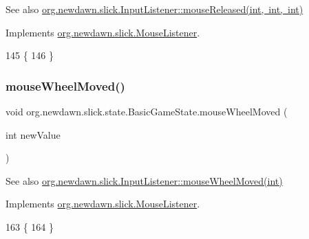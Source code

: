 \begin{DoxySeeAlso}{See also}
\mbox{\hyperlink{interfaceorg_1_1newdawn_1_1slick_1_1_mouse_listener_a8d1606869f610664f9299565067d5571}{org.\+newdawn.\+slick.\+Input\+Listener\+::mouse\+Released(int, int, int)}} 
\end{DoxySeeAlso}


Implements \mbox{\hyperlink{interfaceorg_1_1newdawn_1_1slick_1_1_mouse_listener_a8d1606869f610664f9299565067d5571}{org.\+newdawn.\+slick.\+Mouse\+Listener}}.


\begin{DoxyCode}
145                                                         \{
146     \}
\end{DoxyCode}
\mbox{\label{classorg_1_1newdawn_1_1slick_1_1state_1_1_basic_game_state_ab4d1fd4e3f8f09700b62bb37fd29006a}} 
\subsubsection{\texorpdfstring{mouse\+Wheel\+Moved()}{mouseWheelMoved()}}
{\footnotesize\ttfamily void org.\+newdawn.\+slick.\+state.\+Basic\+Game\+State.\+mouse\+Wheel\+Moved (\begin{DoxyParamCaption}\item[{int}]{new\+Value }\end{DoxyParamCaption})\hspace{0.3cm}{\ttfamily [inline]}}

\begin{DoxySeeAlso}{See also}
\mbox{\hyperlink{interfaceorg_1_1newdawn_1_1slick_1_1_mouse_listener_ad7e49c969e1f0315ecdf238f715953d1}{org.\+newdawn.\+slick.\+Input\+Listener\+::mouse\+Wheel\+Moved(int)}} 
\end{DoxySeeAlso}


Implements \mbox{\hyperlink{interfaceorg_1_1newdawn_1_1slick_1_1_mouse_listener_ad7e49c969e1f0315ecdf238f715953d1}{org.\+newdawn.\+slick.\+Mouse\+Listener}}.


\begin{DoxyCode}
163                                               \{
164     \}
\end{DoxyCode}
\mbox{\label{classorg_1_1newdawn_1_1slick_1_1state_1_1_basic_game_state_ae453e5cfaf7e00181a981ca4e25bb82e}} 

